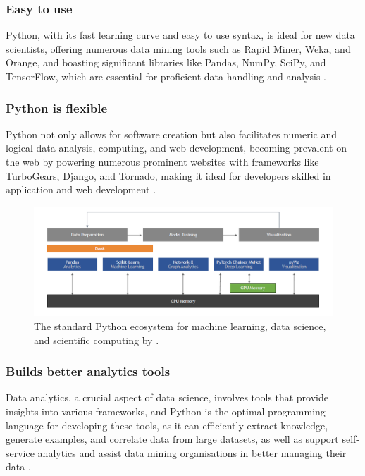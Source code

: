 \documentclass[conference]{IEEEtran}
\begin{document}
\subsubsection{Easy to use}

Python, with its fast learning curve and easy to use syntax, is ideal for new data scientists, offering numerous data mining tools such as Rapid Miner, Weka, and Orange, and boasting significant libraries like Pandas, NumPy, SciPy, and TensorFlow, which are essential for proficient data handling and analysis \cite{b8}.

\subsubsection{Python is flexible}

Python not only allows for software creation but also facilitates numeric and logical data analysis, computing, and web development, becoming prevalent on the web by powering numerous prominent websites with frameworks like TurboGears, Django, and Tornado, making it ideal for developers skilled in application and web development \cite{b8}.

\begin{figure}[h]
    \centering
    \includegraphics[width=\linewidth]{Ecosystem.png}
    \caption{The standard Python ecosystem for machine learning, data science,
    and scientific computing by \cite{b33}.}
    \label{figPY}
\end{figure}

\subsubsection{Builds better analytics tools}

Data analytics, a crucial aspect of data science, involves tools that provide insights into various frameworks, and Python is the optimal programming language for developing these tools, as it can efficiently extract knowledge, generate examples, and correlate data from large datasets, as well as support self-service analytics and assist data mining organisations in better managing their data \cite{b8}.
\end{document}
